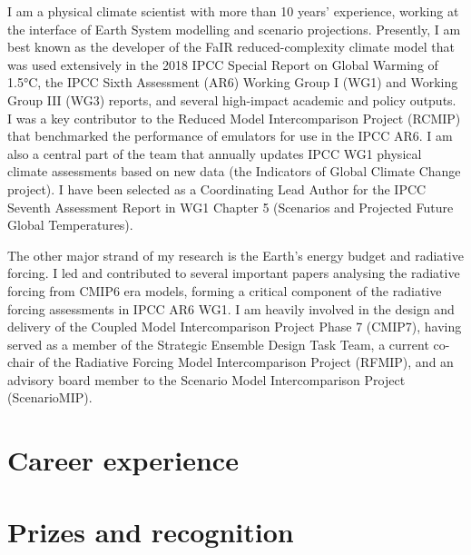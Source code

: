 \documentclass[11pt,a4paper,sans]{moderncv}
\begin{document}
\makecvtitle

I am a physical climate scientist with more than 10 years' experience, working at the interface of Earth System modelling and scenario projections. Presently, I am best known as the developer of the FaIR reduced-complexity climate model that was used extensively in the 2018 IPCC Special Report on Global Warming of 1.5°C, the IPCC Sixth Assessment (AR6) Working Group I (WG1) and Working Group III (WG3) reports, and several high-impact academic and policy outputs. I was a key contributor to the Reduced Model Intercomparison Project (RCMIP) that benchmarked the performance of emulators for use in the IPCC AR6. I am also a central part of the team that annually updates IPCC WG1 physical climate assessments based on new data (the Indicators of Global Climate Change project). I have been selected as a Coordinating Lead Author for the IPCC Seventh Assessment Report in WG1 Chapter 5 (Scenarios and Projected Future Global Temperatures).

The other major strand of my research is the Earth's energy budget and radiative forcing. I led and contributed to several important papers analysing the radiative forcing from CMIP6 era models, forming a critical component of the radiative forcing assessments in IPCC AR6 WG1. I am heavily involved in the design and delivery of the Coupled Model Intercomparison Project Phase 7 (CMIP7), having served as a member of the Strategic Ensemble Design Task Team, a current co-chair of the Radiative Forcing Model Intercomparison Project (RFMIP), and an advisory board member to the Scenario Model Intercomparison Project (ScenarioMIP).

\section{Career experience}

\section{Prizes and recognition}
\end{document}
